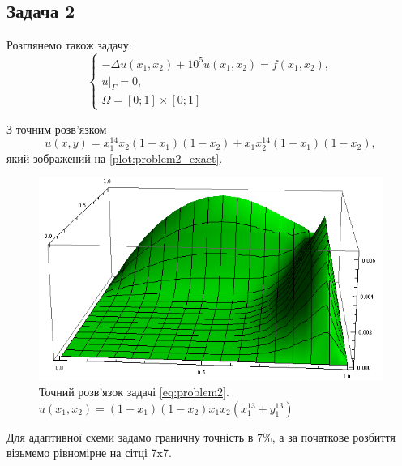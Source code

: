 
\subsection{Задача 2}

Розглянемо також задачу:
\begin{equation}\label{eq:problem2}
\begin{cases}
	- \Delta u(x_1,x_2) + 10^5 u(x_1, x_2) = f(x_1,x_2), \\
	u|_\Gamma = 0 ,\\
	\Omega = \left[0;1\right] \times \left[0;1\right]
\end{cases}
\end{equation}

З точним розв'язком
\begin{equation}
	u(x,y) = x_1^{14}x_2(1-x_1)(1-x_2)+x_1 x_2^{14}(1-x_1)(1-x_2),
\end{equation}
%
який зображений на \autoref{plot:problem2_exact}.
\begin{figure}[H]
	\centering
    \includegraphics[scale=0.7]{problem2/ExactSolution}
    \captionsetup{format=hang,justification=centering}
    \caption{Точний розв'язок задачі \eqref{eq:problem2}. \newline $u(x_1,x_2) = (1-x_1)(1-x_2)x_1x_2(x_1^{13}+y_1^{13})$ }
    \label{plot:problem2_exact}
\end{figure}

Для адаптивної схеми задамо граничну точність в 7\%, а за початкове розбиття візьмемо рівномірне на сітці 7x7.

